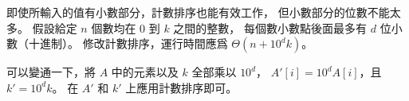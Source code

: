 \startEXERCISE
即使所輸入的值有小數部分，計數排序也能有效工作，
但小數部分的位數不能太多。
假設給定 $n$ 個數均在 $0$ 到 $k$ 之間的整數，
每個數小數點後面最多有 $d$ 位小數（十進制）。
修改計數排序，運行時間應爲 $\Theta(n+10^d k)$。
\stopEXERCISE

\startANSWER
可以變通一下，將 $A$ 中的元素以及 $k$ 全部乘以 $10^d$，
 $A'[i] = 10^d A[i]$，且 $k'=10^d k$。
在 $A'$ 和 $k'$ 上應用計數排序即可。
\stopANSWER

